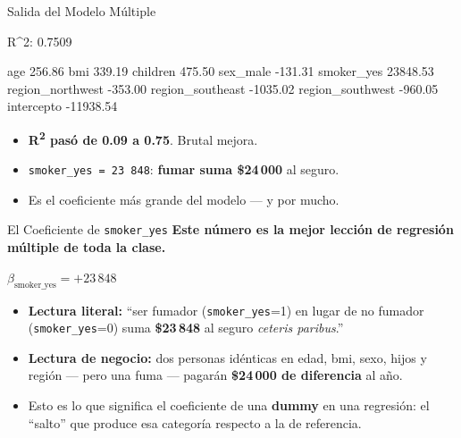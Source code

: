 \documentclass[aspectratio=169, 11pt]{beamer}
\begin{document}
\begin{frame}[fragile,shrink=28]{Salida del Modelo Múltiple}
  \vspace{-6pt}
  \begin{outputblock}
R^2: 0.7509

  age                    256.86
  bmi                    339.19
  children               475.50
  sex_male              -131.31
  smoker_yes           23848.53
  region_northwest      -353.00
  region_southeast      -1035.02
  region_southwest      -960.05
  intercepto          -11938.54
  \end{outputblock}

  \vspace{4pt}
  {\scriptsize\color{textMuted}
  \begin{itemize}\setlength{\itemsep}{3pt}
    \item[{\color{codeGreen}\scriptsize\faCheckCircle}]
      \textbf{R\textsuperscript{2} pasó de 0.09 a 0.75}. Brutal mejora.
    \item[{\color{codeOrange}\scriptsize\faExclamationTriangle}]
      \texttt{smoker\_yes = 23\,848}: \textbf{fumar suma \$24\,000} al seguro.
    \item[{\color{arcaRed}\scriptsize\faArrowRight}]
      Es el coeficiente más grande del modelo --- y por mucho.
  \end{itemize}
  }
\end{frame}

\begin{frame}[shrink=5]{El Coeficiente de \texttt{smoker\_yes}}
  \vspace{-4pt}
  {\footnotesize\color{arcaDark}\bfseries
    Este número es la mejor lección de regresión múltiple de toda la clase.}

  \vspace{8pt}
  \begin{center}
    \begin{tcolorbox}[colback=arcaGray, colframe=arcaRed, boxrule=1pt,
                      arc=4pt, width=0.7\textwidth]
    \centering
    $\beta_{\text{smoker\_yes}} = +23\,848$
    \end{tcolorbox}
  \end{center}

  \vspace{6pt}
  {\footnotesize
  \begin{itemize}\setlength{\itemsep}{5pt}
    \item[{\color{arcaRed}\faArrowRight}]
      \textbf{Lectura literal:} ``ser fumador (\texttt{smoker\_yes}=1)
      en lugar de no fumador (\texttt{smoker\_yes}=0) suma
      \textbf{\$23\,848} al seguro \textit{ceteris paribus}.''
    \item[{\color{arcaRed}\faArrowRight}]
      \textbf{Lectura de negocio:} dos personas idénticas en edad,
      bmi, sexo, hijos y región --- pero una fuma --- pagarán
      \textbf{\$24\,000 de diferencia} al año.
    \item[{\color{arcaRed}\faArrowRight}]
      Esto es lo que significa el coeficiente de una \textbf{dummy}
      en una regresión: el ``salto'' que produce esa categoría
      respecto a la de referencia.
  \end{itemize}
  }
\end{frame}
\end{document}
